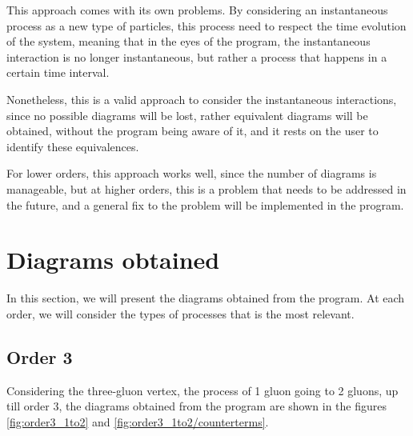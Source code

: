 \documentclass[11pt,a4paper,twoside,pdf]{article}
\numberwithin{equation}{section}
\begin{document}
This approach comes with its own problems. By considering an instantaneous 
process as a new type of particles, this process need to respect the time 
evolution of the system, meaning that in the eyes of the program, the 
instantaneous interaction is no longer instantaneous, but rather a process that
happens in a certain time interval. 

Nonetheless, this is a valid approach to consider the instantaneous interactions, 
since no possible diagrams will be lost, rather equivalent diagrams will be 
obtained, without the program being aware of it, and it rests on the user to
identify these equivalences. 

For lower orders, this approach works well, since the number of diagrams is
manageable, but at higher orders, this is a problem that needs to be addressed in 
the future, and a general fix to the problem will be implemented in the program.

\newpage

\section{Diagrams obtained} \label{sec:diagrams}

In this section, we will present the diagrams obtained from the program. At 
each order, we will consider the types of processes that is the most relevant.


\subsection{Order 3}

Considering the three-gluon vertex, the process of 1 gluon going to 2 gluons, up till 
order 3, the diagrams obtained from the program are shown in the figures 
\ref{fig:order3_1to2} and \ref{fig:order3_1to2/counterterms}.
\end{document}

